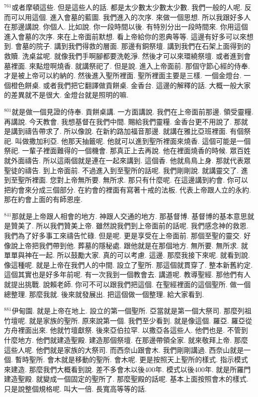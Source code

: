 \documentclass{book}
\begin{document}
$^{761}$或者摩頓這些.
但是這些人的話.
都是太少數太少數太少數.
我們一般的人呢.
反而可以用這個.
進入會墓的藍圖.
我們進入的次序.
來做一個思想.
所以我跟好多人在那邊講說.
你個人.
比如說.
你一段時間以後.
有特別分出一段時間來.
你用這個進入會墓的次序.
來在上帝面前默想.
看上帝給你的恩典等等.
這邊有好多可以來想到.
會墓的院子.
講到我們得救的層面.
那邊有銅祭壇.
講到我們在石架上面得到的救贖.
洗桌盆呢.
就像我們手啊腳都要洗乾淨.
然後才可以來環繞祭壇.
或者進到會墓裡面.
來點燈啊燒香.
就講祭祀了.
但是說.
進入上帝面前.
那個守節心經的侍奉.
才是被上帝可以約納的.
然後進入聖所裡面.
聖所裡面主要是三樣.
一個金燈台.
一個橙色餅桌.
或者我們把它翻譯做貢餅桌.
金香台.
這邊的解釋的話.
大概一般大家的差異就不是很大.
金燈台就是照明的嘛.

$^{801}$就是做一個見證的侍奉.
貢餅桌講.
一方面講說.
我們在上帝面前那邊.
領受靈糧.
再講說.
今天教會.
我想基督在我們中間.
賜給我們靈糧.
金香台更不用說了.
那就是講到禱告帶求了.
所以像說.
在新約路加福音那邊.
就講在雅比亞班裡面.
有個祭祀.
叫做撒加利亞.
他那天抽籤呢.
他就可以進到聖所裡面來燒香.
這個可能是一個祭祀.
一輩子裡面難得的一個機會.
那真正上去再說.
他在裡面燒香的時候.
眾百姓就外面禱告.
所以這兩個就是連在一起來講到.
這個香.
他就鳥鳥上身.
那就代表眾聖徒的禱告.
到上帝面前.
不過進入到至聖所的話呢.
我們剛剛說.
就講靈交了.
進到至聖所裡面.
您對上帝無所要.
無所求.
那只有什麼呢.
在這邊講到約會.
你可以把約會來分成三個部分.
在約會的裡面有寫著十戒的法板.
代表上帝跟人立的永約.
那在約會上面的有師恩座.

$^{841}$那就是上帝跟人相會的地方.
神跟人交通的地方.
那基督博.
基督博的基本意思就是贊美了.
所以我們贊美上帝.
雖然說我們到上帝面前的話呢.
我們感念神的救恩.
我們為了好多事工來禱告忙碌.
但是呢.
更是享受在上帝面前.
那個至聖的靈交.
好像說上帝把我們帶到他.
葬墓的隱秘處.
跟他就是在那個地方.
無所要.
無所求.
就單單與神在一起.
所以鼓勵大家.
真的可以考慮.
這邊.
那麼我接下來呢.
就看到說.
像這種呢.
就是上帝在我們人的中間.
設立了聖所.
那這個就貫穿了.
整本新舊約定.
這個其實也是好多年前呢.
有一次我到一個教會去.
講道呢.
教導聖經.
那他們有人就提出挑戰.
說賴老師.
你可不可以跟我們把這個.
在聖經裡面的這個聖所.
做一個總整理.
那麼我就.
後來就發展出.
把這個做一個整理.
給大家看到.

$^{881}$伊甸園.
就是上帝在地上.
設立的第一個聖所.
亞當就是第一個大祭司.
那麼列祖竹壇呢.
就是家族的聖所.
原來說第一個.
我們至少看到.
就是像這個.
羅亞.
羅亞從方舟裡面出來.
他就竹壇獻祭.
後來亞伯拉罕.
以撒亞各這些人.
他們也是.
不管到什麼地方.
他們就建造聖殿.
建造那個祭壇.
在那邊帶領全家.
就來敬拜上帝.
那麼這些人呢.
他們就是家族的大祭司.
而西奈山跟會木.
我們剛剛講過.
西奈山就是一個.
暫時聖所.
會木就是移動的聖所.
會木呢.
更是按照天上聖所的樣式.
指示模式來建造.
那麼我們大概看到說.
差不多會木以後400年.
模式以後400年.
就是所羅門建造聖殿.
就變成一個固定的聖所了.
那麼聖殿的話呢.
基本上面按照會木的樣式.
只是說整個規格呢.
叫大一倍.
長寬高等等的話.
\end{document}
